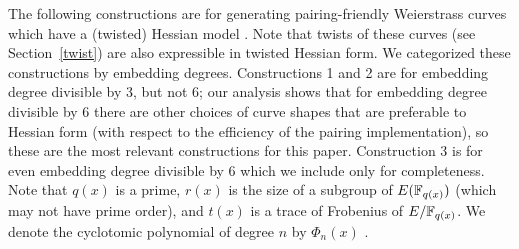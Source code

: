 The following constructions are for generating pairing-friendly Weierstrass curves
which have a (twisted) Hessian model \cite[Section 5]{2015/hessian}.
Note that twists of these curves (see Section~\ref{twist}) are also expressible in twisted Hessian form.
We categorized these constructions by embedding degrees.
Constructions 1 and 2 are for embedding degree divisible by 3, but not 6;
our analysis shows that for embedding degree divisible by 6 there are 
other choices of curve shapes that are preferable to Hessian form
(with respect to the efficiency of the pairing implementation), 
so these are the most relevant constructions for this paper.
Construction 3 is for even embedding degree divisible by 6 which
we include only for completeness.
Note that $q(x)$ is a prime,
$r(x)$ is the size of a subgroup of $E(\mathbb{F}_{q(x)})$ (which may not have prime order),
and $t(x)$ is a trace of Frobenius of $E/\mathbb{F}_{q(x)}$.
We denote the cyclotomic polynomial of degree $n$ by $\Phi_{n}(x)$ .



